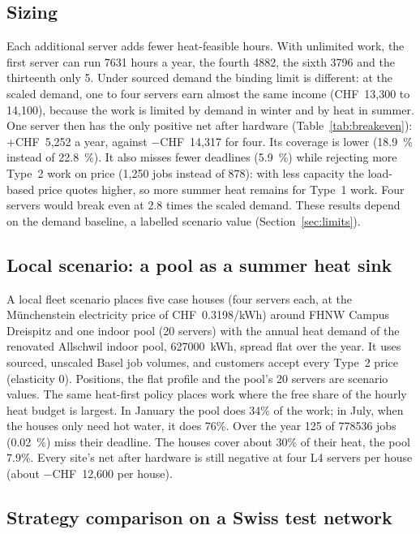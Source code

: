 \subsection{Sizing}
\label{sec:eval-sizing}

Each additional server adds fewer heat-feasible hours. With unlimited work, the first server can run
\num{7631} hours a year, the fourth \num{4882}, the sixth \num{3796} and the thirteenth only 5.
Under sourced demand the binding limit is different: at the scaled demand, one to four servers
earn almost the same income (CHF~13,300 to 14,100), because the work is limited by demand in winter
and by heat in summer. One server then has the only positive net after hardware
(Table~\ref{tab:breakeven}): $+$CHF~5,252 a year, against $-$CHF~14,317 for four. Its coverage is
lower (\qty{18.9}{\percent} instead of \qty{22.8}{\percent}). It also misses fewer deadlines
(\qty{5.9}{\percent}) while rejecting more Type~2 work on price (1,250 jobs instead of 878): with
less capacity the load-based price quotes higher, so more summer heat remains for Type~1 work. Four servers would break even at 2.8 times the scaled demand. These results depend on the
demand baseline, a labelled scenario value (Section~\ref{sec:limits}).

\subsection{Local scenario: a pool as a summer heat sink}
\label{sec:eval-local}

A local fleet scenario places five case houses (four servers each, at the Münchenstein electricity
price of CHF~0.3198/kWh) around FHNW Campus Dreispitz and one indoor pool (20 servers) with the
annual heat demand of the renovated Allschwil indoor pool, \qty{627000}{kWh}, spread flat over the
year. It uses sourced, unscaled Basel job volumes, and customers accept every Type~2 price
(elasticity 0). Positions, the flat profile and the pool's 20 servers are scenario values. The same heat-first policy places work where the free share of the hourly
heat budget is largest. In January the pool does 34\% of the work; in July, when the houses only
need hot water, it does 76\%. Over the year 125 of \num{778536} jobs (\qty{0.02}{\percent}) miss
their deadline. The houses cover about 30\% of their heat, the pool 7.9\%. Every site's net after
hardware is still negative at four L4 servers per house (about $-$CHF~12,600 per house).

\subsection{Strategy comparison on a Swiss test network}
\label{sec:eval-network}

